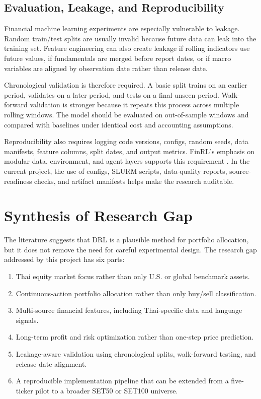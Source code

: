 \documentclass[11pt]{article}
\begin{document}
\subsection{Evaluation, Leakage, and Reproducibility}
Financial machine learning experiments are especially vulnerable to leakage. Random train/test splits are usually invalid because future data can leak into the training set. Feature engineering can also create leakage if rolling indicators use future values, if fundamentals are merged before report dates, or if macro variables are aligned by observation date rather than release date.

Chronological validation is therefore required. A basic split trains on an earlier period, validates on a later period, and tests on a final unseen period. Walk-forward validation is stronger because it repeats this process across multiple rolling windows. The model should be evaluated on out-of-sample windows and compared with baselines under identical cost and accounting assumptions.

Reproducibility also requires logging code versions, configs, random seeds, data manifests, feature columns, split dates, and output metrics. FinRL's emphasis on modular data, environment, and agent layers supports this requirement \cite{finrl}. In the current project, the use of configs, SLURM scripts, data-quality reports, source-readiness checks, and artifact manifests helps make the research auditable.

\section{Synthesis of Research Gap}
The literature suggests that DRL is a plausible method for portfolio allocation, but it does not remove the need for careful experimental design. The research gap addressed by this project has six parts:
\begin{enumerate}
    \item Thai equity market focus rather than only U.S. or global benchmark assets.
    \item Continuous-action portfolio allocation rather than only buy/sell classification.
    \item Multi-source financial features, including Thai-specific data and language signals.
    \item Long-term profit and risk optimization rather than one-step price prediction.
    \item Leakage-aware validation using chronological splits, walk-forward testing, and release-date alignment.
    \item A reproducible implementation pipeline that can be extended from a five-ticker pilot to a broader SET50 or SET100 universe.
\end{enumerate}
\end{document}
